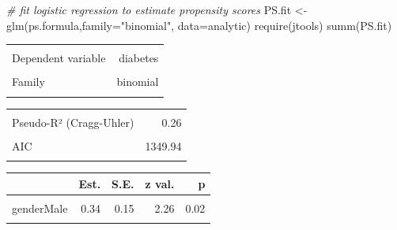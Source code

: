 \documentclass[
]{book}
\newenvironment{Shaded}{\begin{snugshade}}{\end{snugshade}}
\newcommand{\AttributeTok}[1]{\textcolor[rgb]{0.77,0.63,0.00}{#1}}
\newcommand{\CommentTok}[1]{\textcolor[rgb]{0.56,0.35,0.01}{\textit{#1}}}
\newcommand{\FunctionTok}[1]{\textcolor[rgb]{0.00,0.00,0.00}{#1}}
\newcommand{\NormalTok}[1]{#1}
\newcommand{\OtherTok}[1]{\textcolor[rgb]{0.56,0.35,0.01}{#1}}
\newcommand{\StringTok}[1]{\textcolor[rgb]{0.31,0.60,0.02}{#1}}
\begin{document}
\begin{Shaded}
\begin{Highlighting}[]
\CommentTok{\# fit logistic regression to estimate propensity scores}
\NormalTok{PS.fit }\OtherTok{\textless{}{-}} \FunctionTok{glm}\NormalTok{(ps.formula,}\AttributeTok{family=}\StringTok{"binomial"}\NormalTok{, }\AttributeTok{data=}\NormalTok{analytic)}
\FunctionTok{require}\NormalTok{(jtools)}
\FunctionTok{summ}\NormalTok{(PS.fit)}
\end{Highlighting}
\end{Shaded}

\begin{table}[!h]
\centering
\begin{tabular}{lr}
\toprule
\cellcolor{gray!6}{Observations} & \cellcolor{gray!6}{1562}\\
Dependent variable & diabetes\\
\cellcolor{gray!6}{Type} & \cellcolor{gray!6}{Generalized linear model}\\
Family & binomial\\
\cellcolor{gray!6}{Link} & \cellcolor{gray!6}{logit}\\
\bottomrule
\end{tabular}
\end{table} \begin{table}[!h]
\centering
\begin{tabular}{lr}
\toprule
\cellcolor{gray!6}{$\chi^2$(10)} & \cellcolor{gray!6}{282.89}\\
Pseudo-R² (Cragg-Uhler) & 0.26\\
\cellcolor{gray!6}{Pseudo-R² (McFadden)} & \cellcolor{gray!6}{0.18}\\
AIC & 1349.94\\
\cellcolor{gray!6}{BIC} & \cellcolor{gray!6}{1408.83}\\
\bottomrule
\end{tabular}
\end{table} \begin{table}[!h]
\centering
\begin{threeparttable}
\begin{tabular}{lrrrr}
\toprule
  & Est. & S.E. & z val. & p\\
\midrule
\cellcolor{gray!6}{(Intercept)} & \cellcolor{gray!6}{-8.38} & \cellcolor{gray!6}{0.58} & \cellcolor{gray!6}{-14.49} & \cellcolor{gray!6}{0.00}\\
genderMale & 0.34 & 0.15 & 2.26 & 0.02\\
\cellcolor{gray!6}{age} & \cellcolor{gray!6}{0.06} & \cellcolor{gray!6}{0.01} & \cellcolor{gray!6}{11.26} & \cellcolor{gray!6}{0.00}\\

\end{tabular}
\end{threeparttable}
\end{table}
\end{document}
